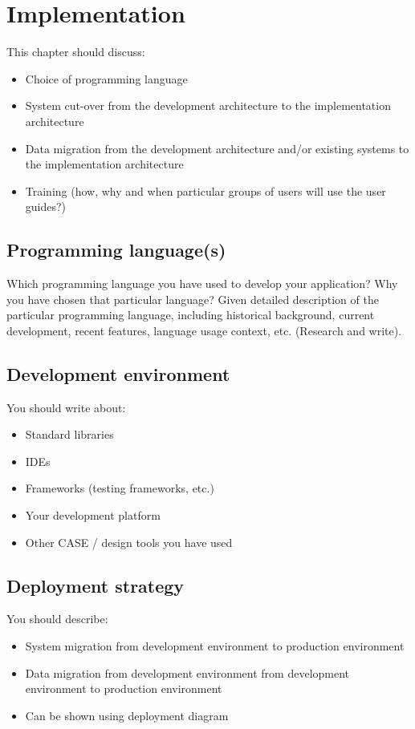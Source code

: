 \chapter{Implementation} %
\label{cha:implementation}
This chapter should discuss:
\begin{itemize}
  \item Choice of programming language
  \item System cut-over from the development architecture to the implementation architecture
  \item Data migration from the development architecture and/or existing systems to the implementation architecture
  \item Training (how, why and when particular groups of users will use the user guides?)
\end{itemize}

\section{Programming language(s)} %
\label{sec:programming_languages}
Which programming language you have used to develop your application?
Why you have chosen that particular language?
Given detailed description of the particular programming language, including historical background, current development, recent features, language usage context, etc. (Research and write).

\section{Development environment} %
\label{sec:development_environment}
You should write about:
\begin{itemize}
  \item Standard libraries
  \item IDEs
  \item Frameworks (testing frameworks, etc.)
  \item Your development platform
  \item Other CASE / design tools you have used
\end{itemize}

\section{Deployment strategy} %
\label{sec:deployment_strategy}
You should describe:
\begin{itemize}
   \item System migration from development environment to production environment
   \item Data migration from development environment from development environment to production environment
   \item Can be shown using deployment diagram
 \end{itemize}

